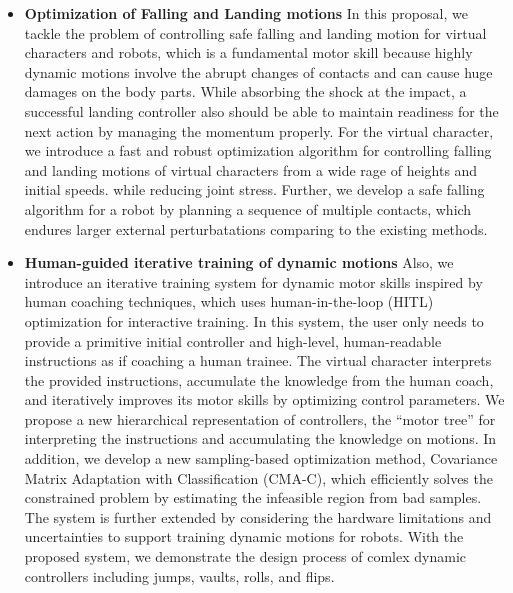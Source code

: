 \begin{itemize}
\item 
  \textbf{Optimization of Falling and Landing motions}
  In this proposal, we tackle the problem of controlling safe falling 
  and landing motion for virtual characters and robots, which is a fundamental
  motor skill because highly dynamic motions involve the abrupt changes
  of contacts and can cause huge damages on the body parts.
  While absorbing the shock at the impact, a successful landing controller 
  also should be able to maintain readiness for the next action by managing
  the momentum properly.
  For the virtual character, we introduce a fast and robust optimization 
  algorithm for controlling falling and landing motions of virtual
  characters from a wide rage of heights and initial speeds.
  while reducing joint stress.
  Further, we develop a safe falling algorithm for a robot by planning a sequence of
  multiple contacts, which endures larger external perturbatations comparing to
  the existing methods.

\item 
  \textbf{Human-guided iterative training of dynamic motions}
  Also, we introduce an iterative training system for dynamic motor skills
  inspired by human coaching techniques, which uses human-in-the-loop
  (HITL) optimization for interactive training.
  In this system, the user only needs to provide a primitive initial controller
  and high-level, human-readable instructions as if coaching a human trainee.
  The virtual character interprets the provided instructions,
  accumulate the knowledge from the human coach,
  and iteratively improves its motor skills by optimizing control parameters.
  We propose a new hierarchical representation of controllers, 
  the ``motor tree'' for interpreting the instructions and accumulating
  the knowledge on motions.
  In addition, we develop a new sampling-based optimization method,
  Covariance Matrix Adaptation with Classification (CMA-C), 
  which efficiently solves the constrained problem by estimating
  the infeasible region from bad samples.
  The system is further extended by considering the hardware limitations 
  and uncertainties to support training dynamic motions for robots.
  With the proposed system, we demonstrate the design process of
  comlex dynamic controllers including jumps, vaults, rolls, and flips.


\end{itemize}

